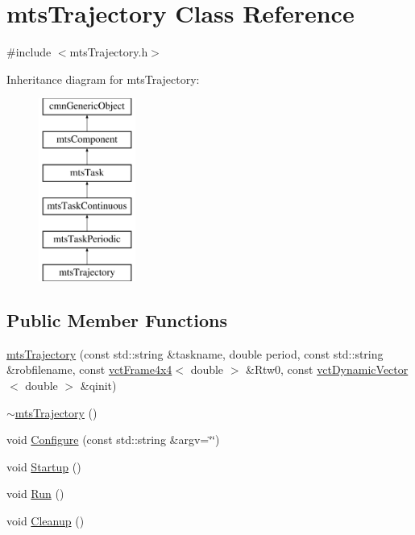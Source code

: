 \hypertarget{classmts_trajectory}{\section{mts\-Trajectory Class Reference}
\label{classmts_trajectory}
}


{\ttfamily \#include $<$mts\-Trajectory.\-h$>$}

Inheritance diagram for mts\-Trajectory\-:\begin{figure}[H]
\begin{center}
\leavevmode
\includegraphics[height=6.000000cm]{d0/d7b/classmts_trajectory}
\end{center}
\end{figure}
\subsection*{Public Member Functions}
\begin{DoxyCompactItemize}
\item 
\hyperlink{classmts_trajectory_a7f02740b9adc62af004c329efdb6373a}{mts\-Trajectory} (const std\-::string \&taskname, double period, const std\-::string \&robfilename, const \hyperlink{classvct_frame4x4}{vct\-Frame4x4}$<$ double $>$ \&Rtw0, const \hyperlink{classvct_dynamic_vector}{vct\-Dynamic\-Vector}$<$ double $>$ \&qinit)
\item 
\hyperlink{classmts_trajectory_a33aa52f55b57b44628dd287f0ba474ed}{$\sim$mts\-Trajectory} ()
\item 
void \hyperlink{classmts_trajectory_a0cfd2f6b4f9922be488d218ebc980ab0}{Configure} (const std\-::string \&argv=\char`\"{}\char`\"{})
\item 
void \hyperlink{classmts_trajectory_a2e179e7bde40a3df6ad3201b0ea5cc69}{Startup} ()
\item 
void \hyperlink{classmts_trajectory_a4b4b3112c8dd657f8a986a161adaff00}{Run} ()
\item 
void \hyperlink{classmts_trajectory_af4b9e7a04714ded3f8b9a9a6a6d66354}{Cleanup} ()
\end{DoxyCompactItemize}
